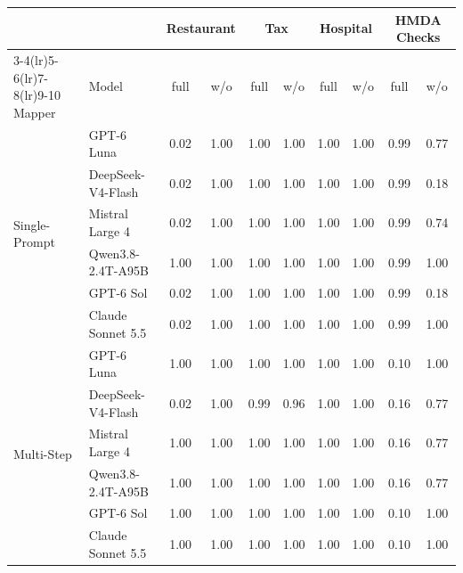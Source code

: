 \begin{tabular}{llcccccccc}
\toprule
 & & \multicolumn{2}{c}{Restaurant} & \multicolumn{2}{c}{Tax} & \multicolumn{2}{c}{Hospital} & \multicolumn{2}{c}{HMDA Checks} \\
\cmidrule(lr){3-4}\cmidrule(lr){5-6}\cmidrule(lr){7-8}\cmidrule(lr){9-10}
Mapper & Model & full & w/o & full & w/o & full & w/o & full & w/o \\
\midrule
\multirow{6}{*}{Single-Prompt} & GPT-6 Luna & 0.02 & 1.00 & 1.00 & 1.00 & 1.00 & 1.00 & 0.99 & 0.77 \\
 & DeepSeek-V4-Flash & 0.02 & 1.00 & 1.00 & 1.00 & 1.00 & 1.00 & 0.99 & 0.18 \\
 & Mistral Large 4 & 0.02 & 1.00 & 1.00 & 1.00 & 1.00 & 1.00 & 0.99 & 0.74 \\
 & Qwen3.8-2.4T-A95B & 1.00 & 1.00 & 1.00 & 1.00 & 1.00 & 1.00 & 0.99 & 1.00 \\
 & GPT-6 Sol & 0.02 & 1.00 & 1.00 & 1.00 & 1.00 & 1.00 & 0.99 & 0.18 \\
 & Claude Sonnet 5.5 & 0.02 & 1.00 & 1.00 & 1.00 & 1.00 & 1.00 & 0.99 & 1.00 \\
\midrule
\multirow{6}{*}{Multi-Step} & GPT-6 Luna & 1.00 & 1.00 & 1.00 & 1.00 & 1.00 & 1.00 & 0.10 & 1.00 \\
 & DeepSeek-V4-Flash & 0.02 & 1.00 & 0.99 & 0.96 & 1.00 & 1.00 & 0.16 & 0.77 \\
 & Mistral Large 4 & 1.00 & 1.00 & 1.00 & 1.00 & 1.00 & 1.00 & 0.16 & 0.77 \\
 & Qwen3.8-2.4T-A95B & 1.00 & 1.00 & 1.00 & 1.00 & 1.00 & 1.00 & 0.16 & 0.77 \\
 & GPT-6 Sol & 1.00 & 1.00 & 1.00 & 1.00 & 1.00 & 1.00 & 0.10 & 1.00 \\
 & Claude Sonnet 5.5 & 1.00 & 1.00 & 1.00 & 1.00 & 1.00 & 1.00 & 0.10 & 1.00 \\
\bottomrule
\end{tabular}
